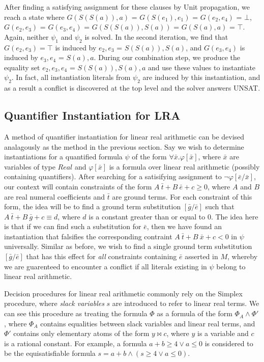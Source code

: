 \documentclass{llncs}
\begin{document}
After finding a satisfying assignment for these clauses by Unit propagation, we reach a state where $G( S(S(a)), a)$ = $G( S(e_1), e_1)$ = $G( e_2, e_4 )$ = $\bot$, $G( e_2, e_3 )$ = $G( e_3, e_4 )$ = $G(S(S(a)), S(a))$ = $G( S(a), a)$ = $\top$.
Again, neither $\psi_1$ and $\psi_2$ is solved.
In the second iteration, we find that $G( e_2, e_3 ) = \top$ is induced by $e_2,e_3$ = $S(S(a)), S(a)$, and $G( e_3, e_4 )$ is induced by $e_3, e_4$ = $S(a), a$.
During our combination step, we produce the equality set $e_2, e_3, e_4$ = $S(S(a)), S(a), a$ and use these values to instantiate $\psi_2$.
In fact, all instantiation literals from $\psi_2$ are induced by this instantiation, and as a result a conflict is discovered at the top level and the solver answers UNSAT.

\subsection{Quantifier Instantiation for LRA}

A method of quantifier instantiation for linear real arithmetic can be devised analagously as the method in the previous section.
Say we wish to determine instantiations for a quantified formula $\psi$ of the form $\forall \bar{x}. \varphi[\bar{x}]$, where $\bar{x}$ are variables of type $Real$ and $\varphi[\bar{x}]$ is a formula over linear real arithmetic (possibly containing quantifiers).
After searching for a satisifying assignment to $\neg \varphi[\bar{e}/\bar{x}]$, our context will contain constraints of the form $A\ \bar{t} + B\ \bar{e} + c \geq 0$, where $A$ and $B$ are real numeral coefficients and $\bar{t}$ are ground terms.
For each constraint of this form, the idea will be to find a ground term substitution $[\bar{g}/\bar{e}]$ such that $A\ \bar{t} + B\ \bar{g} + c \equiv d$, where $d$ is a constant greater than or equal to $0$.
The idea here is that if we can find such a substitution for $\bar{e}$, then we have found an instantiation that falsifies the corresponding contraint $A\ \bar{t} + B\ \bar{x} + c < 0$ in $\psi$ universally.
Similar as before, we wish to find a single ground term substitution $[\bar{g}/\bar{e}]$ that has this effect for \emph{all} constraints containing $\bar{e}$ asserted in $M$, whereby we are guarenteed to encounter a conflict if all literals existing in $\psi$ belong to linear real arithmetic.

Decision procedures for linear real arithmetic commonly rely on the Simplex procedure, where \emph{slack variables} $s$ are introduced to refer to linear real terms.
We can see this procedure as treating the formula $\Phi$ as a formula of the form $\Phi_A \wedge \Phi'$, where $\Phi_A$ contains equalities between slack variables and linear real terms, and $\Phi'$ contains only elementary atoms of the form $y \bowtie c$, where $y$ is a variable and $c$ is a rational constant.
For example, a formula $a + b \geq 4 \vee a \leq 0$ is considered to be the equisatisfiable formula $s = a + b \wedge ( s \geq 4 \vee a \leq 0 )$.
\end{document}
